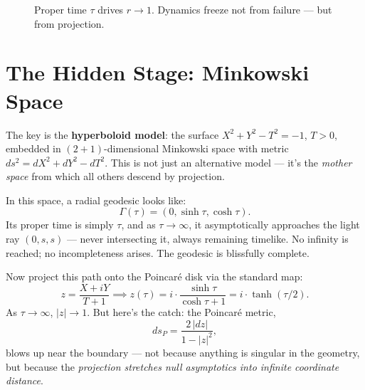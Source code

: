 \documentclass[10pt]{article}
\begin{document}
\begin{figure}[H]
\centering
{}
\caption{Proper time $\tau$ drives $r \to 1$. Dynamics freeze not from failure --- but from projection.}
\label{fig:radial_flow}
\end{figure}

\section*{The Hidden Stage: Minkowski Space}

The key is the \textbf{hyperboloid model}: the surface $X^2 + Y^2 - T^2 = -1$, $T > 0$, embedded in $(2+1)$-dimensional Minkowski space with metric $ds^2 = dX^2 + dY^2 - dT^2$. This is not just an alternative model --- it's the \emph{mother space} from which all others descend by projection.

In this space, a radial geodesic looks like:
\begin{equation*}
\Gamma(\tau) = (0, \sinh\tau, \cosh\tau).
\end{equation*}
Its proper time is simply $\tau$, and as $\tau \to \infty$, it asymptotically approaches the light ray $(0, s, s)$ --- never intersecting it, always remaining timelike. No infinity is reached; no incompleteness arises. The geodesic is blissfully complete.

Now project this path onto the Poincaré disk via the standard map:
\begin{equation*}
z = \frac{X + iY}{T + 1} \implies z(\tau) = i \cdot \frac{\sinh\tau}{\cosh\tau + 1} = i \cdot \tanh(\tau/2).
\end{equation*}
As $\tau \to \infty$, $|z| \to 1$. But here's the catch: the Poincaré metric,
\begin{equation*}
ds_P = \frac{2\,|dz|}{1 - |z|^2},
\end{equation*}
blows up near the boundary --- not because anything is singular in the geometry, but because the \emph{projection stretches null asymptotics into infinite coordinate distance}.
\end{document}
